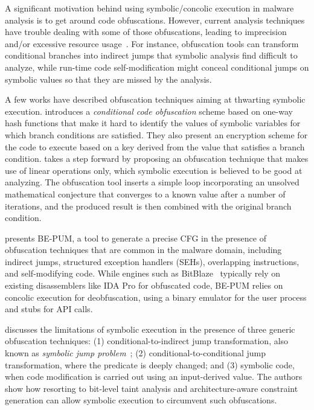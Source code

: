 A significant motivation behind using symbolic/concolic execution in malware analysis is to get around code obfuscations. However, current analysis techniques have trouble dealing with some of those obfuscations, leading to imprecision and/or excessive resource usage~\cite{YD-CCS15}. For instance, obfuscation tools can transform conditional branches into indirect jumps that symbolic analysis find difficult to analyze, while run-time code self-modification might conceal conditional jumps on symbolic values so that they are missed by the analysis.

A few works have described obfuscation techniques aiming at thwarting symbolic execution. \cite{SLG-NDSS08} introduces a {\em conditional code obfuscation} scheme based on one-way hash functions that make it hard to identify the values of symbolic variables for which branch conditions are satisfied. They also present an encryption scheme for the code to execute based on a key derived from the value that satisfies a branch condition. %
\cite{WMJ-ESORICS11} takes a step forward by proposing an obfuscation technique that makes use of linear operations only, which symbolic execution is believed to be good at analyzing. %
The obfuscation tool inserts a simple loop incorporating an unsolved mathematical conjecture that converges to a known value after a number of iterations, and the produced result is then combined with the original branch condition. %

\cite{HOT-FPS15} presents BE-PUM, a tool to generate a precise CFG in the presence of obfuscation techniques that are common in the malware domain, including indirect jumps, structured exception handlers (SEHs), overlapping instructions, and self-modifying code. While engines such as {\sc BitBlaze}~\cite{BITBLAZE-ICISS08} typically rely on existing disassemblers like IDA Pro for obfuscated code, BE-PUM relies on concolic execution for deobfuscation, using a binary emulator for the user process and stubs for API calls.

\cite{YD-CCS15} discusses the limitations of symbolic execution in the presence of three generic obfuscation techniques: (1) conditional-to-indirect jump transformation, also known as {\em symbolic jump problem}~\cite{SAB-SP10}; (2) conditional-to-conditional jump transformation, where the predicate is deeply changed; and (3) symbolic code, when code modification is carried out using an input-derived value. The authors show how resorting to bit-level taint analysis and architecture-aware constraint generation can allow symbolic execution to circumvent such obfuscations.